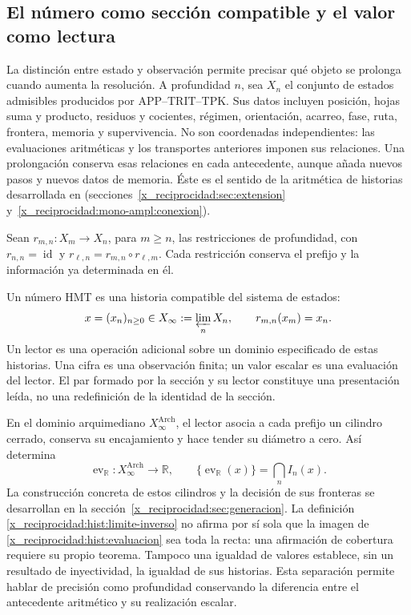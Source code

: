 \subsection{El número como sección compatible y el valor como lectura}
\label{x_reciprocidad:hist:seccion}

La distinción entre estado y observación permite precisar qué objeto se
prolonga cuando aumenta la resolución. A profundidad \(n\), sea \(X_n\)
el conjunto de estados admisibles producidos por APP--TRIT--TPK. Sus datos
incluyen posición, hojas suma y producto, residuos y cocientes, régimen,
orientación, acarreo, fase, ruta, frontera, memoria y supervivencia. No son
coordenadas independientes: las evaluaciones aritméticas y los transportes
anteriores imponen sus relaciones. Una prolongación conserva esas relaciones
en cada antecedente, aunque añada nuevos pasos y nuevos datos de memoria.
Éste es el sentido de la aritmética de historias desarrollada en
(secciones~\ref{x_reciprocidad:sec:extension} y~\ref{x_reciprocidad:mono-ampl:conexion}).

Sean \(r_{m,n}:X_m\to X_n\), para \(m\geq n\), las restricciones de
profundidad, con \(r_{n,n}=\operatorname{id}\) y
\(r_{\ell,n}=r_{m,n}\circ r_{\ell,m}\). Cada restricción conserva el
prefijo y la información ya determinada en él.

\begin{definition}
Un número HMT es una historia compatible del sistema de estados:
\begin{equation}
 x=(x_n)_{n\geq0}\in X_\infty:=\varprojlim_n X_n,
 \qquad r_{m,n}(x_m)=x_n.
 \label{x_reciprocidad:hist:limite-inverso}
\end{equation}
Un lector es una operación adicional sobre un dominio especificado de estas
historias. Una cifra es una observación finita; un valor escalar es una
evaluación del lector. El par formado por la sección y su lector constituye
una presentación leída, no una redefinición de la identidad de la sección.
\end{definition}

En el dominio arquimediano \(X_\infty^{\mathrm{Arch}}\), el lector asocia
a cada prefijo un cilindro cerrado, conserva su encajamiento y hace tender
su diámetro a cero. Así determina
\begin{equation}
 \operatorname{ev}_{\mathbb R}:X_\infty^{\mathrm{Arch}}\longrightarrow
 \mathbb R,\qquad
 \{\operatorname{ev}_{\mathbb R}(x)\}=\bigcap_n I_n(x).
 \label{x_reciprocidad:hist:evaluacion}
\end{equation}
La construcción concreta de estos cilindros y la decisión de sus fronteras
se desarrollan en la sección~\ref{x_reciprocidad:sec:generacion}. La definición
\eqref{x_reciprocidad:hist:limite-inverso} no afirma por sí sola que la imagen de
\eqref{x_reciprocidad:hist:evaluacion} sea toda la recta: una afirmación de cobertura
requiere su propio teorema. Tampoco una igualdad de valores establece, sin
un resultado de inyectividad, la igualdad de sus historias. Esta separación
permite hablar de precisión como profundidad conservando la diferencia
entre el antecedente aritmético y su realización escalar.

